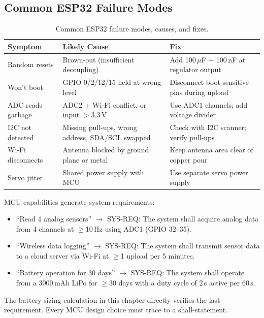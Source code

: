 \subsection{Common ESP32 Failure Modes}
\begin{table}[htbp]\centering\small
\begin{tabularx}{\textwidth}{l X X}
\toprule
\textbf{Symptom} & \textbf{Likely Cause} & \textbf{Fix} \\
\midrule
Random resets & Brown-out (insufficient decoupling) & Add 100\,$\mu$F + 100\,nF at regulator output \\
Won't boot & GPIO 0/2/12/15 held at wrong level & Disconnect boot-sensitive pins during upload \\
ADC reads garbage & ADC2 + Wi-Fi conflict, or input $>$3.3\,V & Use ADC1 channels; add voltage divider \\
I2C not detected & Missing pull-ups, wrong address, SDA/SCL swapped & Check with I2C scanner; verify pull-ups \\
Wi-Fi disconnects & Antenna blocked by ground plane or metal & Keep antenna area clear of copper pour \\
Servo jitter & Shared power supply with MCU & Use separate servo power supply \\
\bottomrule
\end{tabularx}
\caption{Common ESP32 failure modes, causes, and fixes.}
\end{table}

\begin{keyconceptbox}
MCU capabilities generate system requirements:
\begin{itemize}[nosep,leftmargin=1.5em]
\item ``Read 4 analog sensors'' $\to$ SYS-REQ: The system shall acquire analog data from 4 channels at $\geq$10\,Hz using ADC1 (GPIO 32--35).
\item ``Wireless data logging'' $\to$ SYS-REQ: The system shall transmit sensor data to a cloud server via Wi-Fi at $\geq$1 upload per 5 minutes.
\item ``Battery operation for 30 days'' $\to$ SYS-REQ: The system shall operate from a 3000\,mAh LiPo for $\geq$30 days with a duty cycle of 2\,s active per 60\,s.
\end{itemize}
The battery sizing calculation in this chapter directly verifies the last requirement. Every MCU design choice must trace to a shall-statement.
\end{keyconceptbox}

